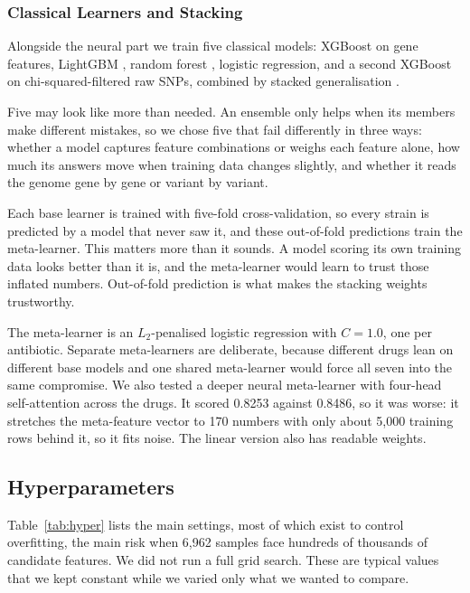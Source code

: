 \documentclass[conference]{IEEEtran}
\begin{document}
\subsubsection{Classical Learners and Stacking}

Alongside the neural part we train five classical models: XGBoost \cite{chen2016}
on gene features, LightGBM \cite{ke2017}, random forest \cite{breiman2001},
logistic regression, and a second XGBoost on chi-squared-filtered raw SNPs, combined
by stacked generalisation \cite{wolpert1992}.

Five may look like more than needed. An ensemble only helps when its members make
different mistakes, so we chose five that fail differently in three ways: whether a
model captures feature combinations or weighs each feature alone, how much its
answers move when training data changes slightly, and whether it reads the genome
gene by gene or variant by variant.

Each base learner is trained with five-fold cross-validation, so every strain is
predicted by a model that never saw it, and these out-of-fold predictions train the
meta-learner. This matters more than it sounds. A model scoring its own training
data looks better than it is, and the meta-learner would learn to trust those
inflated numbers. Out-of-fold prediction is what makes the stacking weights
trustworthy.

The meta-learner is an $L_2$-penalised logistic regression with $C = 1.0$, one per
antibiotic. Separate meta-learners are deliberate, because different drugs lean on
different base models and one shared meta-learner would force all seven into the
same compromise. We also tested a deeper neural meta-learner with four-head
self-attention across the drugs. It scored 0.8253 against 0.8486, so it was worse:
it stretches the meta-feature vector to 170 numbers with only about 5{,}000 training
rows behind it, so it fits noise. The linear version also has readable weights.

\subsection{Hyperparameters}

Table~\ref{tab:hyper} lists the main settings, most of which exist to control
overfitting, the main risk when 6{,}962 samples face hundreds of thousands of
candidate features. We did not run a full grid search. These are typical values that we kept constant
while we varied only what we wanted to compare.
\end{document}
